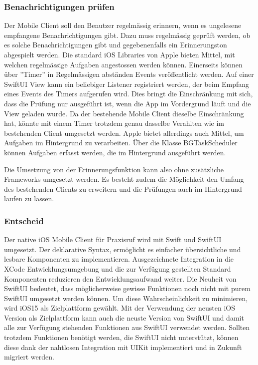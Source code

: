 \subsubsection{Benachrichtigungen prüfen}

Der Mobile Client soll den Benutzer regelmässig erinnern, wenn es ungelesene empfangene Benachrichtigungen gibt.
Dazu muss regelmässig geprüft werden, ob es solche Benachrichtigungen gibt und gegebenenfalls ein Erinnerungston abgespielt werden.
Die standard iOS Libraries von Apple bieten Mittel, mit welchen regelmässige Aufgaben angestossen werden können.
Einerseits können über ''Timer'' in Regelmässigen abständen Events veröffentlicht werden.
Auf einer SwiftUI View kann ein beliebiger Listener registriert werden, der beim Empfang eines Events des Timers aufgerufen wird.
Dies bringt die Einschränkung mit sich, dass die Prüfung nur ausgeführt ist, wenn die App im Vordergrund läuft und die View geladen wurde.\cite{ios_timer}
Da der bestehende Mobile Client dieselbe Einschränkung hat, könnte mit einem Timer trotzdem genau dasselbe Verahlten wie im bestehenden Client umgesetzt werden.
Apple bietet allerdings auch Mittel, um Aufgaben im Hintergrund zu verarbeiten.
Über die Klasse BGTaskScheduler können Aufgaben erfasst werden, die im Hintergrund ausgeführt werden.\cite{ios_bgtaskscheduler}

Die Umsetzung von der Erinnerungsfunktion kann also ohne zusätzliche Frameworks umgesetzt werden.
Es besteht zudem die Möglichkeit den Umfang des bestehenden Clients zu erweitern und die Prüfungen auch im Hintergrund laufen zu lassen.

\subsubsection{Entscheid}

Der native iOS Mobile Client für Praxisruf wird mit Swift und SwiftUI umgesetzt.
Der deklarative Syntax, ermöglicht es einfacher übersichtliche und lesbare Komponenten zu implementieren.
Ausgezeichnete Integration in die XCode Entwicklungsumgebung und die zur Verfügung gestellten Standard Komponenten reduzieren den Entwicklungsaufwand weiter.
Die Neuheit von SwiftUI bedeutet, dass möglicherweise gewisse Funktionen noch nicht mit purem SwiftUI umgesetzt werden können.
Um diese Wahrscheinlichkeit zu minimieren, wird iOS15 als Zielplattform gewählt.
Mit der Verwendung der neusten iOS Version als Zielplattform kann auch die neuste Version von SwiftUI und damit alle zur Verfügung stehenden Funktionen aus SwiftUI verwendet werden.
Sollten trotzdem Funktionen benötigt werden, die SwiftUI nicht unterstützt, können diese dank der nahtlosen Integration mit UIKit implementiert und in Zukunft migriert werden.

\clearpage
